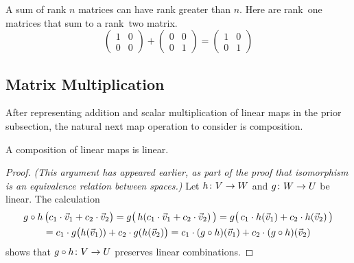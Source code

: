 \begin{exercises}
\begin{answer}
\begin{exparts}
          A sum of rank \( n \) matrices can have rank greater than \( n \).
          Here are rank~one matrices that sum to a rank~two matrix.
          \begin{equation*}
            \begin{pmatrix}
              1  &0  \\
              0  &0
            \end{pmatrix}
            +\begin{pmatrix}
              0  &0  \\
              0  &1
            \end{pmatrix}
            =\begin{pmatrix}
              1  &0  \\
              0  &1
            \end{pmatrix}
          \end{equation*}
      \end{exparts}  
    \end{answer}
\end{exercises}











\subsection{Matrix Multiplication}
After representing addition and scalar multiplication of linear maps
in the prior subsection, the natural next map operation to consider 
is composition.

\begin{lemma}
A composition of linear maps is linear.  
\end{lemma}

\begin{proof}
\textit{(This argument has appeared earlier, 
as part of the proof that isomorphism
is an equivalence relation between spaces.)}  
Let $\mbox{$h\colon V\to W$}$ and $\mbox{$g\colon W\to U$}$ be linear. 
The calculation
\begin{multline*}
  g\mathbin\circ h\,\bigl(c_1\cdot\vec{v}_1+c_2\cdot\vec{v}_2\bigr)
     =g\bigl(\,h(c_1\cdot \vec{v}_1+c_2\cdot\vec{v}_2)\,\bigr)        
     =g\bigl(\,c_1\cdot h(\vec{v}_1)+c_2\cdot h(\vec{v}_2)\,\bigr) \\ 
     =c_1\cdot g\bigl(h(\vec{v}_1))+c_2\cdot g(h(\vec{v}_2)\bigr)  
     =c_1\cdot (g\mathbin\circ h)(\vec{v}_1)
                  +c_2\cdot (g\mathbin\circ h)(\vec{v}_2)
\end{multline*}
shows that $\mbox{$g\mathbin\circ h\colon V\to U$}$
preserves linear combinations.
\end{proof}

